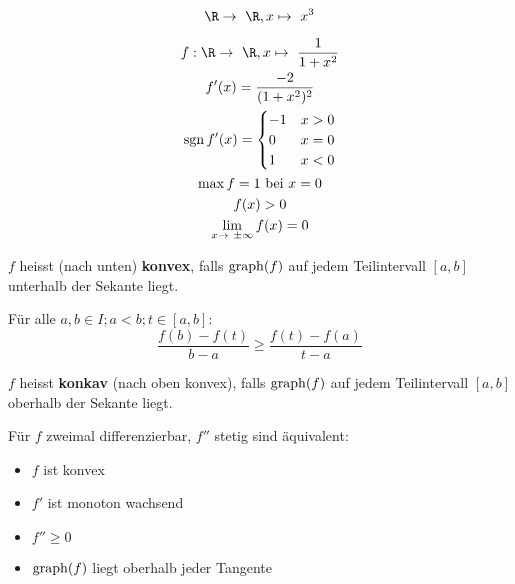 \begin{bsp*}
	\[ \R \rightarrow \R , x \mapsto x^3 \]
\end{bsp*}
\begin{bsp*}
	\begin{gather*}
		f: \R \rightarrow \R , x \mapsto \frac{1}{1+x^2} \\
		f'(x) = \frac{-2}{(1+x^2)^2} \\
		\sgn f'(x) = \begin{cases}
			-1	&x > 0	\\
			0	&x = 0	\\
			1	&x < 0	
		\end{cases} \\
		\max f = 1 \text{ bei } x = 0 \\
		f(x) > 0 \\
		\lim_{x \rightarrow \pm \infty} f(x) = 0
	\end{gather*}
\end{bsp*}
\begin{def*}[note = konvex , index = konvex]
	$f$ heisst (nach unten) \textbf{konvex}, falls $\operatorname{graph}(f)$ auf jedem Teilintervall $[a,b]$ unterhalb der Sekante liegt.
	
	Für alle $a, b \in I ; a < b ; t \in [a,b]$:
	\[ \frac{f(b) - f(t)}{b-a} \geq \frac{f(t) - f(a)}{t-a} \]
\end{def*}
\begin{def*}[note = konkav , index = konkav]
	$f$ heisst \textbf{konkav} (nach oben konvex), falls $\operatorname{graph}(f)$ auf jedem Teilintervall $[a,b]$ oberhalb der Sekante liegt.
\end{def*}
\begin{beh}
	Für $f$ zweimal differenzierbar, $f''$ stetig sind äquivalent:
	\begin{itemize}
		\item $f$ ist konvex
		\item $f'$ ist monoton wachsend
		\item $f'' \geq 0$
		\item $\operatorname{graph}(f)$ liegt oberhalb jeder Tangente
	\end{itemize}
\end{beh}
